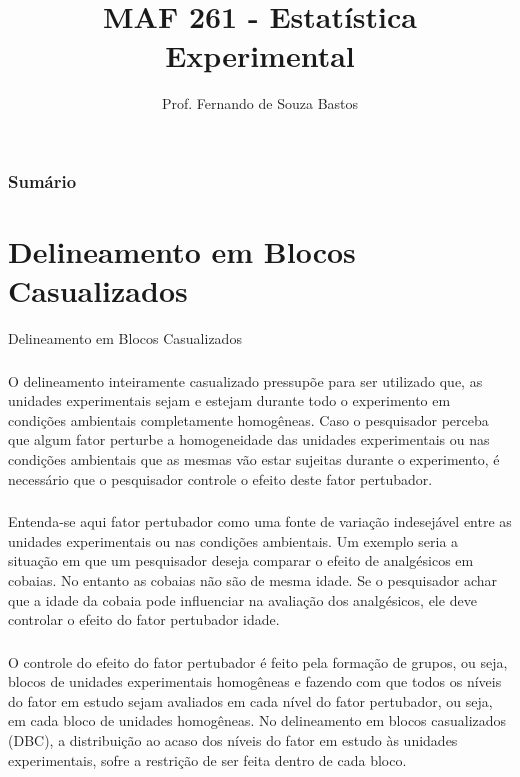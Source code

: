 \documentclass[14pt,aspectratio=1610]{beamer}
\title{MAF 261 - Estatística Experimental}
\author{Prof. Fernando de Souza Bastos}
\institute{Instituto de Ciências Exatas e Tecnológicas\texorpdfstring{\\ Universidade Federal de Viçosa}{}\texorpdfstring{\\ Campus UFV - Florestal}{}}
\date[\today]{}
\begin{document}


\frame{\titlepage}

\begin{frame}{}
\frametitle{\bf Sumário}
\tableofcontents
\end{frame}

\section{Delineamento em Blocos Casualizados}
\begin{frame}{Delineamento em Blocos Casualizados}
\frametitle{}
\begin{block}{}
\justifying
O delineamento inteiramente casualizado pressupõe para ser utilizado que, as
unidades experimentais sejam e estejam durante todo o experimento em condições
ambientais completamente homogêneas. Caso o pesquisador perceba que algum fator
perturbe a homogeneidade das unidades experimentais ou nas condições ambientais que
as mesmas vão estar sujeitas durante o experimento, é necessário que o pesquisador
controle o efeito deste fator pertubador.

\end{block}
\end{frame}

\begin{frame}{}
\frametitle{}
\begin{block}{}
\justifying
Entenda-se aqui fator pertubador como uma fonte de variação indesejável entre as unidades experimentais ou nas condições ambientais. Um exemplo seria a situação em que um pesquisador deseja comparar o efeito de analgésicos em cobaias. No entanto as cobaias não são de mesma idade. Se o pesquisador achar que a idade da cobaia pode influenciar na avaliação dos analgésicos, ele deve controlar o efeito do fator pertubador idade.
\end{block}
\end{frame}

\begin{frame}{}
\frametitle{}
\begin{block}{}
\justifying
O controle do efeito do fator pertubador é feito pela formação de grupos, ou seja,
blocos de unidades experimentais homogêneas e fazendo com que todos os níveis do
fator em estudo sejam avaliados em cada nível do fator pertubador, ou seja, em cada
bloco de unidades homogêneas. No delineamento em blocos casualizados (DBC), a
distribuição ao acaso dos níveis do fator em estudo às unidades experimentais, sofre a restrição de ser feita dentro de cada bloco.
\end{block}
\end{frame}
\end{document}
